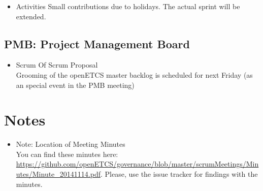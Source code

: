 \documentclass[a4paper, 11pt]{article}
\begin{document}
\begin{itemize}
\item Activities
Small contributions due to holidays. The actual sprint will be extended.
\end{itemize}

\subsection{PMB: Project Management Board}
\begin{itemize}

\item Scrum Of Scrum Proposal\\
Grooming of the openETCS master backlog is scheduled for next Friday (as an special event in the PMB meeting)
\end{itemize}

\section{Notes}
\begin{itemize}

\item Note: Location of Meeting Minutes\\
You can find these minutes here: \url{https://github.com/openETCS/governance/blob/master/scrumMeetings/Minutes/Minute_20141114.pdf}. Please, use the issue tracker for findings with the minutes.

\end{itemize}
\end{document}
